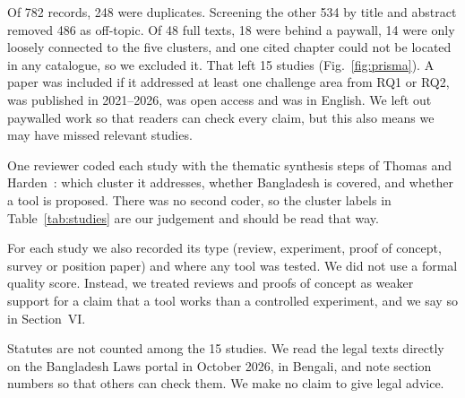 \documentclass[conference]{IEEEtran}
\begin{document}
Of 782 records, 248 were duplicates. Screening the other 534 by title and abstract removed 486 as off-topic. Of 48 full texts, 18 were behind a paywall, 14 were only loosely connected to the five clusters, and one cited chapter could not be located in any catalogue, so we excluded it. That left 15 studies (Fig.~\ref{fig:prisma}). A paper was included if it addressed at least one challenge area from RQ1 or RQ2, was published in 2021--2026, was open access and was in English. We left out paywalled work so that readers can check every claim, but this also means we may have missed relevant studies.

One reviewer coded each study with the thematic synthesis steps of Thomas and Harden~\cite{thomas}: which cluster it addresses, whether Bangladesh is covered, and whether a tool is proposed. There was no second coder, so the cluster labels in Table~\ref{tab:studies} are our judgement and should be read that way.

For each study we also recorded its type (review, experiment, proof of concept, survey or position paper) and where any tool was tested. We did not use a formal quality score. Instead, we treated reviews and proofs of concept as weaker support for a claim that a tool works than a controlled experiment, and we say so in Section~VI.

Statutes are not counted among the 15 studies. We read the legal texts directly on the Bangladesh Laws portal in October 2026, in Bengali, and note section numbers so that others can check them. We make no claim to give legal advice.
\end{document}
